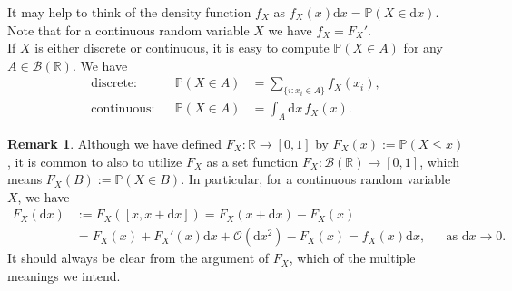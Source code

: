 \documentclass[12pt]{book}
\numberwithin{equation}{chapter}
\theoremstyle{plain}
\numberwithin{theorem}{section}
\theoremstyle{definition}
\newtheorem{remark}[theorem]{\underline{Remark}}
\numberwithin{exercise}{chapter}
\newcommand{\<}{\langle}
\renewcommand{\>}{\rangle}
\renewcommand{\(}{\left(}
\renewcommand{\)}{\right)}
\renewcommand{\[}{\left[}
\renewcommand{\]}{\right]}
\newcommand\Pb{\mathds{P}}
\newcommand\Rb{\mathds{R}}
\newcommand\Bc{\mathscr{B}}
\newcommand\Oc{\mathscr{O}}
\newcommand\dd{\mathrm{d}}
\begin{document}
\noindent
It may help to think of the density function $f_X$ as $f_X(x)\dd x = \Pb( X \in \dd x )$.
\\[0.5em]
Note that for a continuous random variable $X$ we have $f_X = F_X'$.
\\[0.5em]
If $X$ is either discrete or continuous, it is easy to compute $\Pb(X \in A)$ for any $A \in \Bc(\Rb)$.  We have
\begin{align}
\text{discrete}:&&
\Pb(X \in A)
	&=	\sum_{\{i : x_i \in A\}} f_X(x_i) , \\
\text{continuous}:&&
\Pb(X \in A)
	&=	\int_A \dd x \, f_X(x) .
\end{align}

\begin{remark}
Although we have defined $F_X : \Rb \to [0,1]$ by $F_X(x) := \Pb( X \leq x )$, it is common to also to utilize $F_X$ as a set function $F_X: \Bc(\Rb) \to [0,1]$, which means $F_X(B) := \Pb( X \in B)$.
In particular, for a continuous random variable $X$, we have
\begin{align}
F_X(\dd x)
	&:= F_X([x,x+\dd x]) = F_X(x + \dd x) - F_X(x) \\
	&=	F_X(x) + F_X'(x) \dd x + \Oc(\dd x^2) - F_X(x)
	=		f_X(x) \dd x , &
	&\text{as $\dd x \to 0$} .
\end{align}
It should always be clear from the argument of $F_X$, which of the multiple meanings we intend.
\end{remark}

\end{document}
